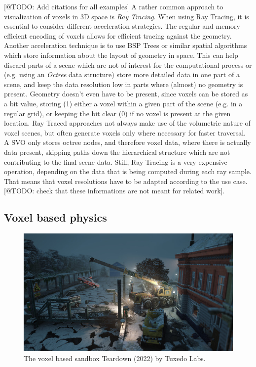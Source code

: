 [@TODO: Add citations for all examples]
A rather common approach to visualization of voxels in 3D space is \emph{Ray Tracing}. When using 
Ray Tracing, it is essential to consider different acceleration strategies. The regular 
and memory efficient encoding of voxels allows for efficient tracing against the geometry. 
Another acceleration technique is to use \ac{BSP} Trees or similar spatial algorithms which store 
information about the layout of geometry in space. This can help discard parts of a scene which are 
not of interest for the computational process or (e.g. using an \emph{Octree} data structure) store 
more detailed data in one part of a scene, and keep the data resolution low in parts where (almost) 
no geometry is present. Geometry doesn't even have to be present, since voxels can be stored 
as a bit value, storing (1) either a voxel within a given part of the scene (e.g. in a regular grid),
or keeping the bit clear (0) if no voxel is present at the given location. 
Ray Traced approaches not always make use of the volumetric nature of voxel scenes, but often generate 
voxels only where necessary for faster traversal. A \ac{SVO} only stores octree nodes, and therefore voxel 
data, where there is actually data present, skipping paths down the hierarchical structure which are not 
contributing to the final scene data. Still, Ray Tracing is a very expensive operation, depending on the 
data that is being computed during each ray sample. That means that voxel resolutions have to be adapted 
according to the use case. [@TODO: check that these informations are not meant for related work].

\subsection{Voxel based physics}

\begin{figure}[h]
    \centering
    \includegraphics[width=\linewidth]{images/graphics/teardown.jpg}
    \caption{The voxel based sandbox Teardown (2022) by Tuxedo Labs.}
    \label{fig:teardown}
\end{figure}


